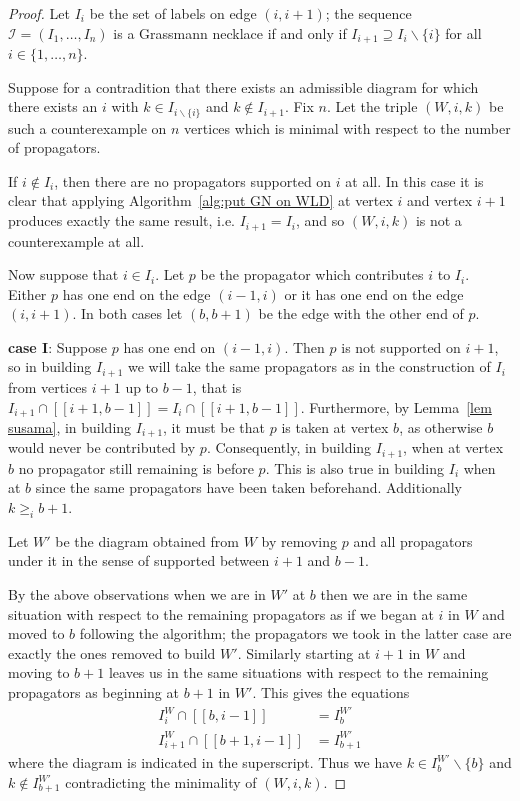 \documentclass[11pt]{article}
\newcommand{\II}{\mathcal{I}}
\newcommand{\interval}[2]{[\![#1,#2]\!]}
\theoremstyle{remark}
\theoremstyle{definition}
\begin{document}
\begin{proof}
Let $I_i$ be the set of labels on edge $(i,i+1)$; the sequence $\II = (I_1, \dots, I_n)$ is a Grassmann necklace if and only if $I_{i+1} \supseteq I_i \backslash \{i\}$ for all $i \in \{1, \dots, n\}$.


Suppose for a contradition that there exists an admissible diagram for which there exists an $i$ with $k\in I_{i\backslash\{i\}}$ and $k \not\in I_{i+1}$.  Fix $n$.  Let the triple $(W, i, k)$ be such a counterexample on $n$ vertices which is minimal with respect to the number of propagators. %

If $i \not\in I_i$, then there are no propagators supported on $i$ at all.  In this case it is clear that applying Algorithm~\ref{alg:put GN on WLD} at vertex $i$ and vertex $i+1$ produces exactly the same result, i.e. $I_{i+1} = I_i$, and so $(W, i, k)$ is not a counterexample at all.

Now suppose that $i \in I_i$.  Let $p$ be the propagator which contributes $i$ to $I_i$.  Either $p$ has one end on the edge $(i-1, i)$ or it has one end on the edge $(i, i+1)$.  In both cases let $(b, b+1)$ be the edge with the other end of $p$.

\textbf{case I}:  Suppose $p$ has one end on $(i-1, i)$.  Then $p$ is not supported on $i+1$, so in building $I_{i+1}$ we will take the same propagators as in the construction of $I_i$ from vertices $i+1$ up to $b-1$, that is $I_{i+1} \cap \interval{i+1}{b-1} = I_{i} \cap \interval{i+1}{b-1}$.  Furthermore, by Lemma~\ref{lem susama}, in building $I_{i+1}$, it must be that $p$ is taken at vertex $b$, as otherwise $b$ would never be contributed by $p$.    Consequently, in building $I_{i+1}$, when at vertex $b$ no propagator still remaining is before $p$.  This is also true in building $I_i$ when at $b$ since the same propagators have been taken beforehand.  Additionally $k\geq_i b+1$.

Let $W'$ be the diagram obtained from $W$ by removing $p$ and all propagators under it in the sense of supported between $i+1$ and $b-1$.

By the above observations when we are in $W'$ at $b$ then we are in the same situation with respect to the remaining propagators as if we began at $i$ in $W$ and moved to $b$ following the algorithm; the propagators we took in the latter case are exactly the ones removed to build $W'$.  Similarly starting at $i+1$ in $W$ and moving to $b+1$ leaves us in the same situations with respect to the remaining propagators as beginning at $b+1$ in $W'$.  This gives the equations
\begin{align*}
  I_i^W \cap \interval{b}{i-1} & = I_b^{W'} \\
  I_{i+1}^W \cap \interval{b+1}{i-1} & = I_{b+1}^{W'}
\end{align*}
where the diagram is indicated in the superscript.
Thus we have $k\in I_b^{W'}\backslash\{b\}$ and $k\not\in I_{b+1}^{W'}$ contradicting the minimality of $(W, i, k)$.


\end{proof}
\end{document}
